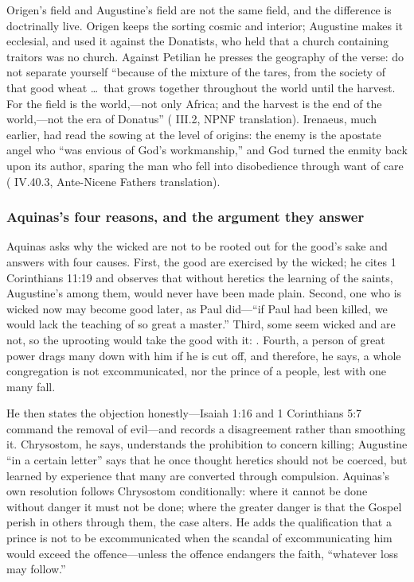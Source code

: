 Origen's field and Augustine's field are not the same field, and the difference
is doctrinally live. Origen keeps the sorting cosmic and interior; Augustine
makes it ecclesial, and used it against the Donatists, who held that a church
containing traitors was no church. Against Petilian he presses the geography of
the verse: do not separate yourself ``because of the mixture of the tares, from
the society of that good wheat \dots\ that grows together throughout the world
until the harvest. For the field is the world,---not only Africa; and the
harvest is the end of the world,---not the era of Donatus'' ( III.2, NPNF translation). Irenaeus, much earlier, had
read the sowing at the level of origins: the enemy is the apostate angel who
``was envious of God's workmanship,'' and God turned the enmity back upon its
author, sparing the man who fell into disobedience through want of care
( IV.40.3, Ante-Nicene Fathers translation).

\subsubsection*{Aquinas's four reasons, and the argument they answer}

Aquinas asks why the wicked are not to be rooted out for the good's sake and
answers with four causes. First, the good are exercised by the wicked; he cites
1 Corinthians 11:19 and observes that without heretics the learning of the
saints, Augustine's among them, would never have been made plain. Second, one
who is wicked now may become good later, as Paul did---``if Paul had been
killed, we would lack the teaching of so great a master.'' Third, some seem
wicked and are not, so the uprooting would take the good with it: . Fourth, a person of great power drags many down with him
if he is cut off, and therefore, he says, a whole congregation is not
excommunicated, nor the prince of a people, lest with one many fall.

He then states the objection honestly---Isaiah 1:16 and 1 Corinthians 5:7
command the removal of evil---and records a disagreement rather than smoothing
it. Chrysostom, he says, understands the prohibition to concern killing;
Augustine ``in a certain letter'' says that he once thought heretics should not
be coerced, but learned by experience that many are converted through
compulsion. Aquinas's own resolution follows Chrysostom conditionally: where it
cannot be done without danger it must not be done; where the greater danger is
that the Gospel perish in others through them, the case alters. He adds the
qualification that a prince is not to be excommunicated when the scandal of
excommunicating him would exceed the offence---unless the offence endangers the
faith, ``whatever loss may follow.''

